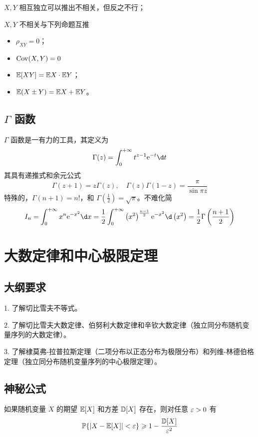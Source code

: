 $X, Y$ 相互独立可以推出不相关，但反之不行；

$X, Y$ 不相关与下列命题互推
\begin{itemize}
	\item $\rho_{XY} = 0$；
	\item $\operatorname{Cov}(X, Y) = 0$
	\item $\mathbb{E}[XY] = \mathbb{E} X \cdot \mathbb{E} Y$；
	\item $\mathbb{E}(X \pm Y) = \mathbb{E} X + \mathbb{E} Y$。
\end{itemize}

\subsection{\texorpdfstring{$\Gamma$ 函数}{Γ 函数}}

$\Gamma$ 函数是一有力的工具，其定义为
\[ \Gamma(z) = \int_{0}^{+\infty} t^{z-1} \ee^{-t} \d t \]
其具有递推式和余元公式
\[ \Gamma(z + 1) = z \Gamma(z), \quad \Gamma(z) \Gamma(1-z) = \frac{\pi}{\sin \pi z} \]
特殊的，$\Gamma(n + 1) = n!$，和 $\Gamma(\frac{1}{2}) = \sqrt{\pi}$。不难化简
\[ I_n = \int_{0}^{+\infty} x^n \ee^{-x^2} \d x = \frac{1}{2} \int_{0}^{+\infty} \left(x^2\right)^{\frac{n-1}{2}} \ee^{-x^2} \d \left(x^2\right) = \frac{1}{2} \Gamma\left(\frac{n+1}{2}\right)  \]

\section{大数定律和中心极限定理}

\subsection{大纲要求}

1. 了解切比雪夫不等式。

2. 了解切比雪夫大数定律、伯努利大数定律和辛钦大数定律（独立同分布随机变量序列的大数定律）。

3. 了解棣莫弗-拉普拉斯定理（二项分布以正态分布为极限分布）和列维-林德伯格定理（独立同分布随机变量序列的中心极限定理）。

\subsection{神秘公式}

\begin{theorem}[切比雪夫不等式]
	如果随机变量 $X$ 的期望 $\mathbb{E} [X]$ 和方差 $\mathbb{D} [X]$ 存在，则对任意 $\varepsilon > 0$ 有
	\[ \mathbb{P}\{|X - \mathbb{E} [X]| < \varepsilon\} \geqslant 1 - \frac{\mathbb{D} [X]}{\varepsilon^2} \]
\end{theorem}

